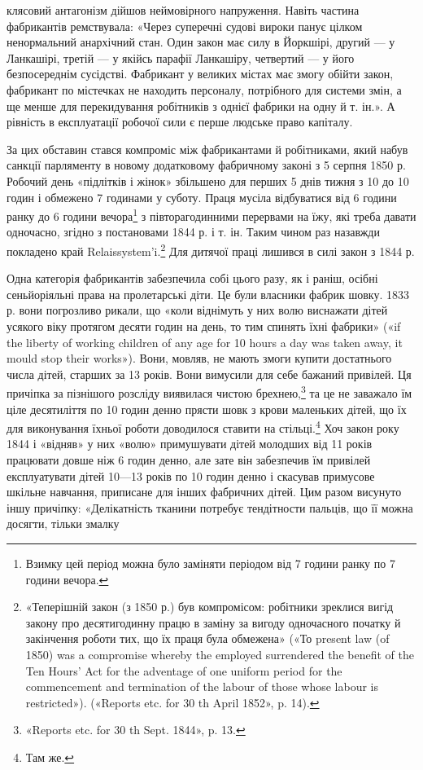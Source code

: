 клясовий антагонізм дійшов неймовірного напруження. Навіть
частина фабрикантів ремствувала: «Через суперечні судові
вироки панує цілком ненормальний анархічний стан. Один закон
має силу в Йоркшірі, другий — у Ланкашірі, третій — у якійсь
парафії Ланкашіру, четвертий — у його безпосереднім сусідстві.
Фабрикант у великих містах має змогу обійти закон, фабрикант
по містечках не находить персоналу, потрібного для системи змін,
а ще менше для перекидування робітників з однієї фабрики на
одну й т. ін.». А рівність в експлуатації робочої сили є перше
людське право капіталу.

За цих обставин стався компроміс між фабрикантами й робітниками,
який набув санкції парляменту в новому додатковому
фабричному законі з 5 серпня 1850 р. Робочий день «підлітків
і жінок» збільшено для перших 5 днів тижня з 10 до 10 годин
і обмежено 7 годинами у суботу. Праця мусіла відбуватися від
6 години ранку до 6 години вечора\footnote{
Взимку цей період можна було заміняти періодом від 7 години
ранку по 7 години вечора.
} з півторагодинними перервами
на їжу, які треба давати одночасно, згідно з постановами
1844 р. і т. ін. Таким чином раз назавжди покладено край
Relaissystem’i.\footnote{
«Теперішній закон (з 1850 р.) був компромісом: робітники зреклися
вигід закону про десятигодинну працю в заміну за вигоду одночасного
початку й закінчення роботи тих, що їх праця була обмежена» («То
present law (of 1850) was a compromise whereby the employed surrendered
the benefit of the Ten Hours’ Act for the adventage of one uniform period
for the commencement and termination of the labour of those whose labour
is restricted»). («Reports etc. for 30 th April 1852», p. 14).
} Для дитячої праці лишився в силі закон з
1844 р.

Одна категорія фабрикантів забезпечила собі цього разу,
як і раніш, осібні сеньйоріяльні права на пролетарські діти. Це
були власники фабрик шовку. 1833 р. вони погрозливо рикали,
що «коли віднімуть у них волю виснажати дітей усякого віку
протягом десяти годин на день, то тим спинять їхні фабрики»
(«if the liberty of working children of any age for 10 hours a day
was taken away, it mould stop their works»). Вони, мовляв, не
мають змоги купити достатнього числа дітей, старших за 13 років.
Вони вимусили для себе бажаний привілей. Ця причіпка за пізнішого
розсліду виявилася чистою брехнею,\footnote{
«Reports etc. for 30 th Sept. 1844», p. 13.
} та це не заважало
їм ціле десятиліття по 10 годин денно прясти шовк з крови
маленьких дітей, що їх для виконування їхньої роботи доводилося
ставити на стільці.\footnote{
Там же.
} Хоч закон року 1844 і «відняв» у них
«волю» примушувати дітей молодших від 11 років працювати
довше ніж 6 годин денно, але зате він забезпечив їм привілей
експлуатувати дітей 10—13 років по 10 годин денно і скасував
примусове шкільне навчання, приписане для інших фабричних
дітей. Цим разом висунуто іншу причіпку: «Делікатність тканини
потребує тендітности пальців, що її можна досягти, тільки змалку